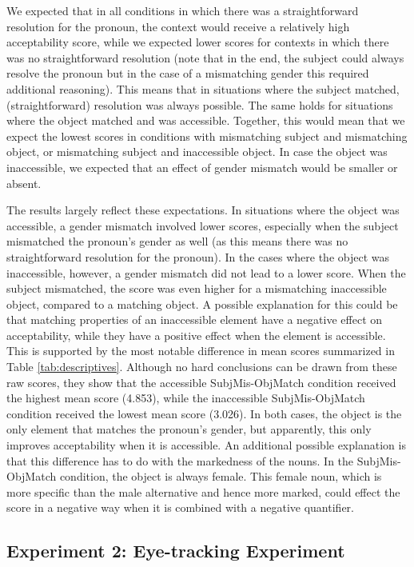 \documentclass[11pt]{article} %
\begin{document}
We expected that in all conditions in which there was a straightforward resolution for the pronoun, the context would receive a relatively high acceptability score, while we expected lower scores for contexts in which there was no straightforward resolution (note that in the end, the subject could always resolve the pronoun but in the case of a mismatching gender this required additional reasoning). This means that in situations where the subject matched, (straightforward) resolution was always possible. The same holds for situations where the object matched and was accessible. Together, this would mean that we expect the lowest scores in conditions with mismatching subject and mismatching object, or mismatching subject and inaccessible object. In case the object was inaccessible, we expected that an effect of gender mismatch would be smaller or absent. 

The results largely reflect these expectations. In situations where the object was accessible, a gender mismatch involved lower scores, especially when the subject mismatched the pronoun's gender as well (as this means there was no straightforward resolution for the pronoun). In the cases where the object was inaccessible, however, a gender mismatch did not lead to a lower score. When the subject mismatched, the score was even higher for a mismatching inaccessible object, compared to a matching object. A possible explanation for this could be that matching properties of an inaccessible element have a negative effect on acceptability, while they have a positive effect when the element is accessible. This is supported by the most notable difference in mean scores summarized in Table \ref{tab:descriptives}. Although no hard conclusions can be drawn from these raw scores, they show that the accessible SubjMis-ObjMatch condition received the highest mean score (4.853), while the inaccessible SubjMis-ObjMatch condition received the lowest mean score (3.026). In both cases, the object is the only element that matches the pronoun's gender, but apparently, this only improves acceptability when it is accessible. An additional possible explanation is that this difference has to do with the markedness of the nouns. In the SubjMis-ObjMatch condition, the object is always female. This female noun, which is more specific than the male alternative and hence more marked, could effect the score in a negative way when it is combined with a negative quantifier. 


\newpage

\subsection{Experiment 2: Eye-tracking Experiment}
\end{document}
